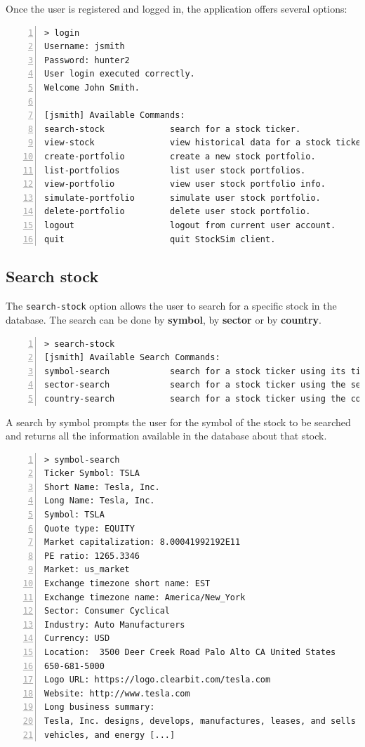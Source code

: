 Once the user is registered and logged in, the application offers several options:

\begin{lstlisting}[basicstyle=\footnotesize\ttfamily,language={},numbers=left,
numberstyle=\footnotesize,numbersep=8pt,frame=single]
> login
Username: jsmith
Password: hunter2
User login executed correctly.
Welcome John Smith.

[jsmith] Available Commands:
search-stock             search for a stock ticker.              
view-stock               view historical data for a stock ticker.
create-portfolio         create a new stock portfolio.           
list-portfolios          list user stock portfolios.             
view-portfolio           view user stock portfolio info.         
simulate-portfolio       simulate user stock portfolio.          
delete-portfolio         delete user stock portfolio.            
logout                   logout from current user account.       
quit                     quit StockSim client.   
\end{lstlisting}

\subsection{Search stock}
The \texttt{search-stock} option allows the user to search for a specific stock in the database. The search can be done by \textbf{symbol}, by \textbf{sector} or by \textbf{country}.\\

\begin{lstlisting}[basicstyle=\footnotesize\ttfamily,language={},numbers=left,
numberstyle=\footnotesize,numbersep=8pt,frame=single]
> search-stock
[jsmith] Available Search Commands:
symbol-search            search for a stock ticker using its ticker.
sector-search            search for a stock ticker using the sector.
country-search           search for a stock ticker using the country.
\end{lstlisting}
A search by symbol prompts the user for the symbol of the stock to be searched and returns all the information available in the database about that stock.
\begin{lstlisting}[basicstyle=\footnotesize\ttfamily,language={},numbers=left,
numberstyle=\footnotesize,numbersep=8pt,frame=single]
> symbol-search
Ticker Symbol: TSLA
Short Name: Tesla, Inc.
Long Name: Tesla, Inc.
Symbol: TSLA
Quote type: EQUITY
Market capitalization: 8.00041992192E11
PE ratio: 1265.3346
Market: us_market
Exchange timezone short name: EST
Exchange timezone name: America/New_York
Sector: Consumer Cyclical
Industry: Auto Manufacturers
Currency: USD
Location:  3500 Deer Creek Road Palo Alto CA United States
650-681-5000
Logo URL: https://logo.clearbit.com/tesla.com
Website: http://www.tesla.com
Long business summary:
Tesla, Inc. designs, develops, manufactures, leases, and sells electric
vehicles, and energy [...]

\end{lstlisting}

